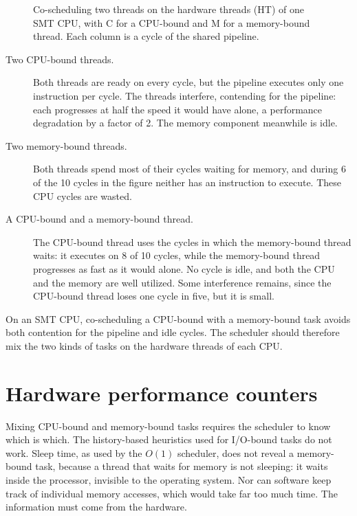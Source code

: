 \documentclass[../main.tex]{subfiles}
\begin{document}
\begin{figure}[htbp]
  \centering
  
  \caption{Co-scheduling two threads on the hardware threads (HT) of one
    SMT CPU, with C for a CPU-bound and M for a memory-bound thread.  Each
    column is a cycle of the shared pipeline.}
  \label{fig:l07-smt}
\end{figure}

\begin{description}
  \item[Two CPU-bound threads.]  Both threads are ready on every cycle, but
    the pipeline executes only one instruction per cycle.  The threads
    interfere, contending for the pipeline: each progresses at half the
    speed it would have alone, a performance degradation by a factor of 2.
    The memory component meanwhile is idle.
  \item[Two memory-bound threads.]  Both threads spend most of their cycles
    waiting for memory, and during 6 of the 10 cycles in the figure neither
    has an instruction to execute.  These CPU cycles are wasted.
  \item[A CPU-bound and a memory-bound thread.]  The CPU-bound thread uses
    the cycles in which the memory-bound thread waits: it executes on 8 of
    10 cycles, while the memory-bound thread progresses as fast as it would
    alone.  No cycle is idle, and both the CPU and the memory are well
    utilized.  Some interference remains, since the CPU-bound thread loses
    one cycle in five, but it is small.
\end{description}

\begin{keypoint}
  On an SMT CPU, co-scheduling a CPU-bound with a memory-bound task avoids
  both contention for the pipeline and idle cycles.  The scheduler should
  therefore mix the two kinds of tasks on the hardware threads of each CPU.
\end{keypoint}

\section{Hardware performance counters}
\label{sec:l07-counters}

Mixing CPU-bound and memory-bound tasks requires the scheduler to know
which is which.  The history-based heuristics used for
I/O-bound tasks do not work.  Sleep time, as used by the $O(1)$ scheduler,
does not reveal a memory-bound task, because a thread that waits for memory
is not sleeping: it waits inside the processor, invisible to the operating
system.  Nor can software keep track of individual memory accesses, which
would take far too much time.  The information must come from the hardware.
\end{document}

